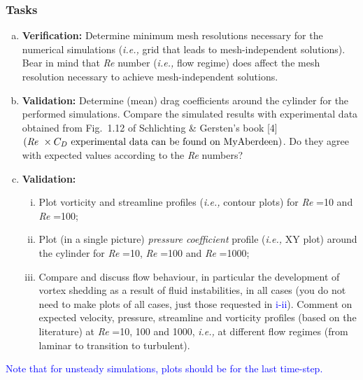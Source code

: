 \documentclass[12pts,a4paper,amsmath,amssymb,floatfix]{article}%
\newcommand{\blue}{\textcolor{blue}}
\newcommand{\ie}{{\it i.e., }}
\newcommand\Rey{\mbox{\textit{Re}}\,\,}
\begin{document}
     \begin{shaded}
       \subsubsection{Tasks}
        \begin{enumerate}[a)]
           \item {\bf Verification:} Determine minimum mesh resolutions necessary for the numerical simulations (\ie grid that leads to mesh-independent solutions). Bear in mind that \Rey number (\ie flow regime) does affect the mesh resolution necessary to achieve mesh-independent solutions.
           \item {\bf Validation:} Determine (mean) drag coefficients around the cylinder for the performed simulations. Compare the simulated results with experimental data obtained from Fig.~1.12 of Schlichting \& Gersten's book [4] $\left(\text{\Rey}\times C_{D} \text{ experimental data can be found on MyAberdeen}\right)$. Do they agree with expected values according to the \Rey numbers?
           \item {\bf Validation:}
             \begin{enumerate}[i)]
               \item Plot vorticity and streamline profiles (\ie contour plots) for \Rey=10 and \Rey=100;
               \item Plot (in a single picture) {\it pressure coefficient} profile (\ie XY plot) around the cylinder for \Rey=10, \Rey=100 and \Rey=1000;
               \item Compare and discuss flow behaviour, in particular the development of vortex shedding as a result of fluid instabilities, in all cases (you do not need to make plots of all cases, just those requested in \blue{i-ii}). Comment on expected velocity, pressure, streamline and vorticity profiles (based on the literature) at \Rey=10, 100 and 1000, \ie at different flow regimes (from laminar to transition to turbulent).
               \end{enumerate}
        \end{enumerate}
        \begin{center}\blue{Note that for unsteady simulations, plots should be for the last time-step.}\end{center}
     \end{shaded}
\end{document}
